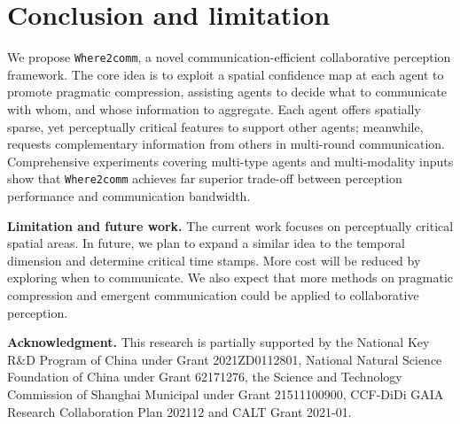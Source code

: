 \vspace{-3mm}
\section{Conclusion and limitation}
\vspace{-3mm}
We propose \texttt{Where2comm}, a novel communication-efficient collaborative perception framework. The core idea is to exploit a spatial confidence map at each agent to promote pragmatic compression, assisting agents to decide what to communicate with whom, and whose information to aggregate. Each agent offers spatially sparse, yet perceptually critical features to support other agents; meanwhile, requests complementary information from others in multi-round communication. Comprehensive experiments covering multi-type agents and multi-modality inputs show that \texttt{Where2comm} achieves far superior trade-off between perception performance and communication bandwidth.

\textbf{Limitation and future work.} 
The current work focuses on perceptually critical spatial areas. In future, we plan to expand a similar idea to the temporal dimension and determine critical time stamps. More cost will be reduced by exploring when to communicate. We also expect that more methods on pragmatic compression and emergent communication could be applied to collaborative perception.

\textbf{Acknowledgment.}
This research is partially supported by the National Key R\&D Program of China under Grant 2021ZD0112801, National Natural Science Foundation of China under Grant 62171276, the Science and Technology Commission of Shanghai Municipal under Grant 21511100900, CCF-DiDi GAIA Research Collaboration Plan 202112 and CALT Grant 2021-01.